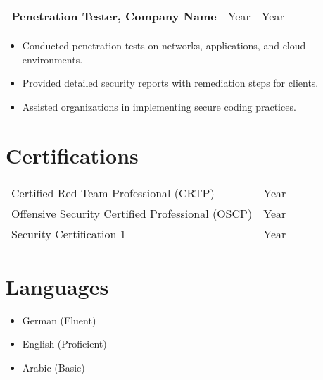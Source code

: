 \documentclass[a4paper,10pt]{article}
\begin{document}
\begin{tabularx}{\linewidth}{X r}
    \textbf{Penetration Tester, Company Name} & Year - Year \\
\end{tabularx}
\begin{itemize}
    \item Conducted penetration tests on networks, applications, and cloud environments.
    \item Provided detailed security reports with remediation steps for clients.
    \item Assisted organizations in implementing secure coding practices.
\end{itemize}

\section*{Certifications}
\begin{tabularx}{\linewidth}{X r}
    Certified Red Team Professional (CRTP) & Year \\
    Offensive Security Certified Professional (OSCP) & Year \\
    Security Certification 1 & Year \\
\end{tabularx}

\section*{Languages}
\begin{itemize}
    \item German (Fluent)
    \item English (Proficient)
    \item Arabic (Basic)
\end{itemize}
\end{document}
